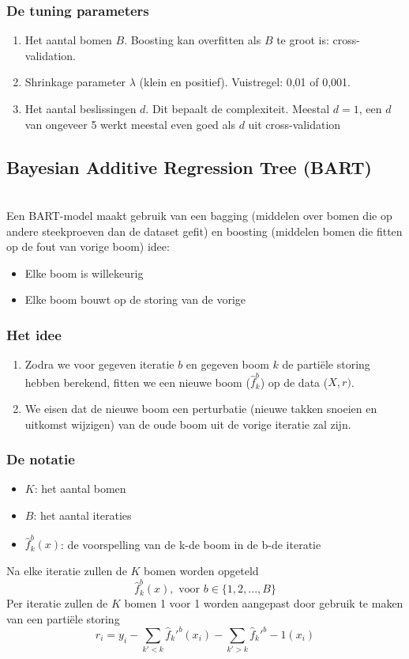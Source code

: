 {\subsubsection{De tuning parameters}
\begin{enumerate}
    \item Het aantal bomen $B$. Boosting kan overfitten als $B$ te groot is: cross-validation.
    \item Shrinkage parameter $\lambda$ (klein en positief). Vuistregel: 0,01 of 0,001.
    \item Het aantal beslissingen $d$. Dit bepaalt de complexiteit. Meestal $d=1$, een $d$ van ongeveer 5 werkt meestal even goed als $d$ uit cross-validation
\end{enumerate}

\subsection{Bayesian Additive Regression Tree (BART)}\\
\noindent Een BART-model maakt gebruik van een bagging (middelen over bomen die op andere steekproeven dan de dataset gefit) en boosting (middelen bomen die fitten op de fout van vorige boom) idee:
\begin{itemize}
    \item Elke boom is willekeurig
    \item Elke boom bouwt op de storing van de vorige 
\end{itemize}

\subsubsection{Het idee}
\begin{enumerate}
    \item Zodra we voor gegeven iteratie $b$ en gegeven boom $k$ de partiële storing hebben berekend, fitten we een nieuwe boom ($\hat{f}_k^b$) op de data ($X,r)$.
    \item We eisen dat de nieuwe boom een perturbatie (nieuwe takken snoeien en uitkomst wijzigen) van de oude boom uit de vorige iteratie zal zijn.
\end{enumerate}

\subsubsection{De notatie}
\begin{itemize}
    \item $K$: het aantal bomen
    \item $B$: het aantal iteraties
    \item $\hat{f}_k^b(x)$: de voorspelling van de k-de boom in de b-de iteratie
\end{itemize}
Na elke iteratie zullen de $K$ bomen worden opgeteld
\[\hat{f}_k^b(x), \textrm{ voor } b \in \{1,2,...,B\}\]
Per iteratie zullen de $K$ bomen 1 voor 1 worden aangepast door gebruik te maken van een partiële storing
\[r_i=y_i-\sum\limits_{k'<k}\hat{f}_k'^b(x_i)-\sum\limits_{k'>k}\hat{f}_k'^b-1(x_i)\]

}
